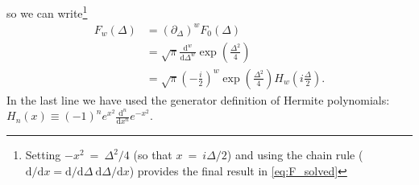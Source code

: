 \documentclass[aip, jcp, reprint, onecolumn, nofootinbib]{revtex4-2}
\begin{document}
so we can write\footnote{Setting $-x^2 \ = \ \Delta^2/4$ (so that $x \ = \ i \Delta /2$) and using the chain rule ($\mathrm{d}/\mathrm{d}x = \mathrm{d}/\mathrm{d}\Delta \ \mathrm{d}\Delta / \mathrm{d}x$) provides the final result in \autoref{eq:F_solved}}
\begin{equation}\label{eq:F_solved}
	\begin{split}
		F_w(\Delta) &= \left(\partial_\Delta \right)^w F_0(\Delta) \\
		&= \sqrt{\pi} \frac{\mathrm{d}^w}{\mathrm{d}\Delta^w} \exp(\frac{\Delta^2}{4}) \\
		&= \sqrt{\pi} \left( -\frac{i}{2} \right)^w \exp(\frac{\Delta^2}{4}) H_w\left(i\frac{\Delta}{2}\right).
	\end{split}
\end{equation}
In the last line we have used the generator definition of Hermite polynomials:  $H_n(x) \equiv (-1)^n e^{x^2} \frac{\mathrm{d}^n}{\mathrm{d}x^n} e^{-x^2}$.
\end{document}
